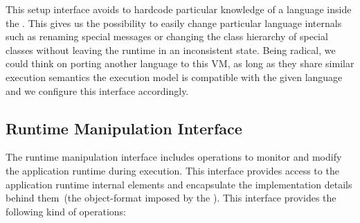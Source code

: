 This \VM setup interface avoids to hardcode particular knowledge of a language inside the \VM. This gives us the possibility to easily change particular language internals such as renaming special messages or changing the class hierarchy of special classes without leaving the runtime in an inconsistent state. Being radical, we could think on porting another language to this VM, as long as they share similar execution semantics \ie the \VM execution model is compatible with the given language and we configure this interface accordingly.



\subsection{Runtime Manipulation Interface} 
The runtime manipulation interface includes operations to monitor and modify the application runtime during execution. This interface provides access to the application runtime internal elements and encapsulate the implementation details behind them~(\ie the object-format imposed by the \VM). This interface provides the following kind of operations:


